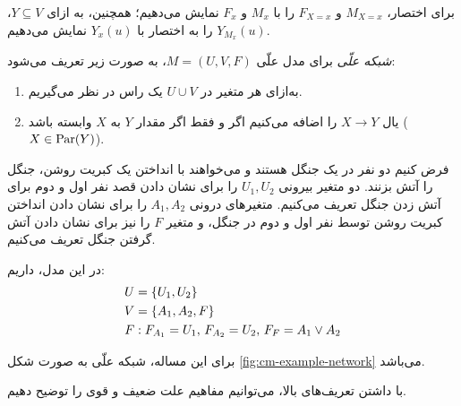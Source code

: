برای اختصار،
$M_{X=x}$ و $F_{X=x}$
را با
$M_x$ و $F_x$
نمایش می‌دهیم؛ همچنین،
به ازای
$Y \subseteq V$،
$Y_{M_x}(u)$
را به اختصار با
$Y_x(u)$
نمایش می‌دهیم.

\begin{definition}\label{def:causal-network}
  \textit{شبکه علّی}
  برای مدل علّی
  $M=(U,V,F)$،
  به صورت زیر تعریف می‌شود:
  \begin{enumerate}[label=(\alph*)]
    \item به‌ازای هر متغیر در
    $U \cup V$
    یک راس در نظر می‌گیریم.
    \item یال
    $X \to Y$
    را اضافه می‌کنیم اگر و فقط اگر
    مقدار
    $Y$
    به
    $X$
    وابسته باشد
    ($X \in \operatorname{Par}(Y)$).
  \end{enumerate}
\end{definition}

\begin{example}\label{ex:causal-model}
  فرض کنیم دو نفر در یک جنگل هستند
  و می‌خواهند با انداختن یک کبریت روشن،
  جنگل را آتش بزنند.
  دو متغیر بیرونی
  $U_1,U_2$
  را برای نشان دادن قصد نفر اول و دوم
  برای آتش زدن جنگل تعریف می‌کنیم.
  متغیرهای درونی
  $A_1,A_2$
  را برای نشان دادن انداختن کبریت روشن
  توسط نفر اول و دوم در جنگل،
  و متغیر
  $F$
  را نیز برای نشان دادن آتش گرفتن جنگل تعریف می‌کنیم. 

  در این مدل، داریم:
  \begin{align*}
    U & = \left\{ U_1,U_2 \right\} \\
    V & = \left\{ A_1,A_2,F \right\} \\
    F & :
      F_{A_1}=U_1,\,
      F_{A_2}=U_2,\,
      F_{F}=A_1 \vee A_2
  \end{align*}

  برای این مساله، شبکه علّی به صورت شکل
  \ref{fig:cm-example-network}
  می‌باشد.

  
\end{example}

با داشتن تعریف‌های بالا،
می‌توانیم مفاهیم علت ضعیف و قوی را توضیح دهیم.

